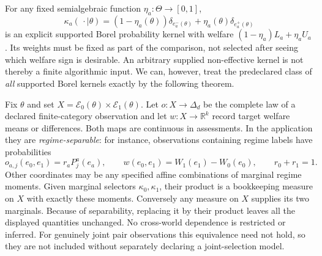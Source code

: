 \documentclass[11pt,a4paper]{article}
\numberwithin{equation}{section}
\theoremstyle{definition}
\newcommand{\R}{\mathbb R}
\begin{document}
For any fixed semialgebraic function $\eta_a:\Theta\to[0,1]$,
\begin{equation}\label{eq:explicit-kernel}
 \kappa_a(\,\cdot\mid\theta)
 =(1-\eta_a(\theta))\delta_{e_a^-(\theta)}
          +\eta_a(\theta)\delta_{e_a^+(\theta)}
\end{equation}
is an explicit supported Borel probability kernel with welfare
$(1-\eta_a)L_a+\eta_a U_a$. Its weights must be fixed as part of the
comparison, not selected after seeing which welfare sign is desirable.
An arbitrary supplied non-effective kernel is not thereby a finite
algorithmic input. We can, however, treat the predeclared class of
\emph{all} supported Borel kernels exactly by the following theorem.

Fix $\theta$ and set
$X=\mathcal E_0(\theta)\times\mathcal E_1(\theta)$. Let
$o:X\to\Delta_d$ be the complete law of a declared finite-category
observation and let $w:X\to\R^k$ record target welfare means or
differences. Both maps are continuous in assessments. In the application
they are \emph{regime-separable}: for instance, observations containing
regime labels have probabilities
\begin{equation}\label{eq:separable}
 o_{a,j}(e_0,e_1)=r_a P^a_j(e_a),\qquad
 w(e_0,e_1)=W_1(e_1)-W_0(e_0),\qquad r_0+r_1=1.
\end{equation}
Other coordinates may be any specified affine combinations of marginal
regime moments. Given marginal selectors $\kappa_0,\kappa_1$, their product
is a bookkeeping measure on $X$ with exactly these moments. Conversely any
measure on $X$ supplies its two marginals. Because of separability, replacing
it by their product leaves all the displayed quantities unchanged. No
cross-world dependence is restricted or inferred. For genuinely joint
pair observations this equivalence need not hold, so they are not included
without separately declaring a joint-selection model.
\end{document}
